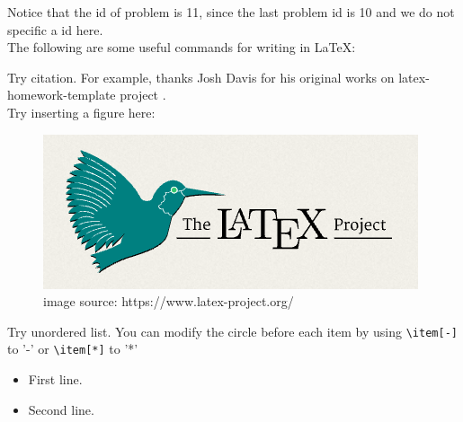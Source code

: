 \documentclass[UTF8]{homework}
\begin{document}
%
%
\begin{homeworkProblem}

    Notice that the id of problem is 11, since the last problem id is 10 and we do not specific a id here. \\

    The following are some useful commands for writing in \LaTeX:

    \solution

    Try citation. For example, thanks Josh Davis for his original works on latex-homework-template project \cite{LatexHomeworkTemplate}. \\

    Try inserting a figure here: 

    \begin{figure}[h]
        \centering
        \includegraphics[scale=0.42]{figures/example.png}
        \caption{image source: https://www.latex-project.org/}
    \end{figure}

    Try unordered list. You can modify the circle before each item by using \verb|\item[-]| to '-' or \verb|\item[*]| to '*'
    
    \begin{itemize}
        \item First line.
        \item Second line.
    \end{itemize}


\end{homeworkProblem}
\end{document}
